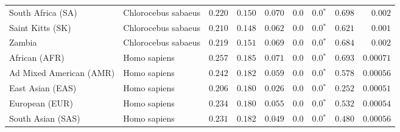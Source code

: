 \begin{center}
\begin{adjustbox}{width = 1\textwidth}
\begin{tabular}{|l|l|r|r|r|r|r|r|r|}
              South Africa (SA) &  Chlorocebus sabaeus &                                        $ 0.220$ &                                           $ 0.150$ &                      $ 0.070$ &            $0.0$ &                  $\bm{0.0{^*}}$ &                                           $ 0.698$ &           $ 0.002$ \\
               Saint Kitts (SK) &  Chlorocebus sabaeus &                                        $ 0.210$ &                                           $ 0.148$ &                      $ 0.062$ &            $0.0$ &                  $\bm{0.0{^*}}$ &                                           $ 0.621$ &           $ 0.001$ \\
                         Zambia &  Chlorocebus sabaeus &                                        $ 0.219$ &                                           $ 0.151$ &                      $ 0.069$ &            $0.0$ &                  $\bm{0.0{^*}}$ &                                           $ 0.684$ &           $ 0.002$ \\
                  African (AFR) &         Homo sapiens &                                        $ 0.257$ &                                           $ 0.185$ &                      $ 0.071$ &            $0.0$ &                  $\bm{0.0{^*}}$ &                                           $ 0.693$ &          $0.00071$ \\
        Ad Mixed American (AMR) &         Homo sapiens &                                        $ 0.242$ &                                           $ 0.182$ &                      $ 0.059$ &            $0.0$ &                  $\bm{0.0{^*}}$ &                                           $ 0.578$ &          $0.00056$ \\
               East Asian (EAS) &         Homo sapiens &                                        $ 0.206$ &                                           $ 0.180$ &                      $ 0.026$ &            $0.0$ &                  $\bm{0.0{^*}}$ &                                           $ 0.252$ &          $0.00051$ \\
                 European (EUR) &         Homo sapiens &                                        $ 0.234$ &                                           $ 0.180$ &                      $ 0.055$ &            $0.0$ &                  $\bm{0.0{^*}}$ &                                           $ 0.532$ &          $0.00054$ \\
              South Asian (SAS) &         Homo sapiens &                                        $ 0.231$ &                                           $ 0.182$ &                      $ 0.049$ &            $0.0$ &                  $\bm{0.0{^*}}$ &                                           $ 0.480$ &          $0.00056$ \\

\end{tabular}
\end{adjustbox}
\end{center}
